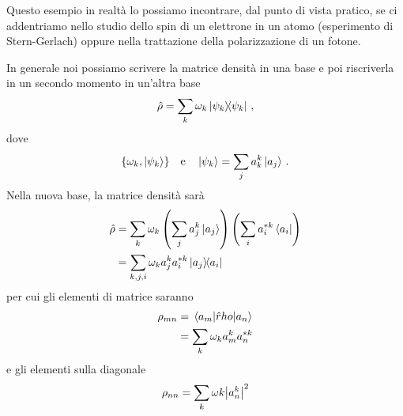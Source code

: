 \noindent Questo esempio in realtà lo possiamo incontrare, dal punto di vista pratico, se ci addentriamo nello studio dello spin di un elettrone in un atomo (esperimento di Stern-Gerlach) oppure nella trattazione della polarizzazione di un fotone.

\noindent In generale noi possiamo scrivere la matrice densità in una base e poi riscriverla in un secondo momento in un'altra base
\begin{equation*}
    \hat \rho = \sum_k \omega_k \op{\psi_k}{\psi_k} \, ,
\end{equation*}
dove 
\begin{equation*}
    \{\omega_k, \ket{\psi_k}\} \quad \text{e} \quad \ket{\psi_k}=\sum_j a_k^k \ket{a_j} \, .
\end{equation*}
Nella nuova base, la matrice densità sarà
\begin{equation*}
    \begin{aligned}
        \hat \rho &= \sum_k {\omega_k}\left(\sum_j a_j^k \ket{a_j}\right)\left(\sum_i a_i^{*k}\bra{a_i}\right) \\
             &= \sum_{k,j,i} \omega_k a_j^ka_i^{*k}\op{a_j}{a_i}
    \end{aligned}
\end{equation*}
per cui gli elementi di matrice saranno
\begin{equation*}
    \begin{aligned}
        \rho_{mn} &= \mel{a_m}{\hat rho}{a_n} \\
                       &= \sum_k \omega_k a_m^ka_n^{*k}
    \end{aligned}
\end{equation*}
e gli elementi sulla diagonale
\begin{equation*}
    \rho_{nn}=\sum_k\omega k \abs{a_n^k}^2
\end{equation*}

